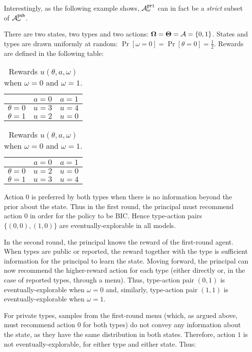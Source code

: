 Interestingly, as the following example shows, $\mathcal{A}_{\omega}^{\mathtt{pri}}$ can in fact be a {\em strict} subset of $\mathcal{A}_{\omega}^{\mathtt{pub}}$.  

\begin{example}
	\label{exp:simple}
	There are two states, two types and two actions: 
	$\bold{\Omega} = \bold{\Theta} = \mathcal{A} = \{0,1\}$. 
	States and types are drawn uniformly at random:
	$\Pr[\omega =0] =\Pr[\theta =0] = \tfrac12$. 
	Rewards are defined in the following table:\\
	\begin{table}[H]
		\centering
		\begin{tabular}{|c||c|c|}
			\hline
			&$a=0$&$a=1$\\
			\hline
			\hline
			$\theta = 0$& $u = 3$ & $u =4$\\
			\hline
			$\theta = 1$& $u = 2$ & $u =0$\\
			\hline
		\end{tabular}
		\quad
		\begin{tabular}{|c||c|c|}
			\hline
			&$a=0$&$a=1$\\
			\hline
			\hline
			$\theta = 0$& $u = 2$ & $u =0$\\
			\hline
			$\theta = 1$& $u = 3$ & $u =4$\\
			\hline
		\end{tabular}
		\caption{Rewards $u(\theta,a,\omega)$ when $\omega =0 $ and $\omega = 1$.}
	\end{table}
\end{example}

Action 0 is preferred by both types when there is no information beyond the prior about the state. Thus in the first round, the principal must recommend action $0$ in order for the policy to be BIC.  Hence type-action pairs $\{(0,0),(1,0)\}$ are eventually-explorable in all models.

In the second round, the principal knows the reward of the first-round agent.  When types are public or reported, the reward together with the type is sufficient information for the principal to learn the state.  Moving forward, the principal can now recommend the higher-reward action for each type (either directly or, in the case of reported types, through a menu).  Thus, type-action pair $(0,1)$ is eventually-explorable when $\omega=0$ and, similarly, type-action pair $(1,1)$ is eventually-explorable when $\omega=1$.

For private types, samples from the first-round menu (which, as argued above, must recommend action $0$ for both types) do not convey any information about the state, as they have the same distribution in both states. Therefore, action $1$ is not eventually-explorable, for either type and either state.  Thus:

